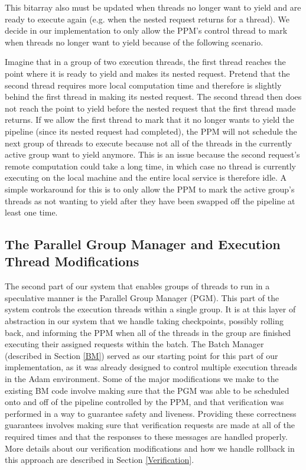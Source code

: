 \documentclass[11pt, oneside]{report}
\begin{document}
This bitarray also must be updated when threads no longer want to yield and are ready to execute again (e.g. when the nested request returns for a thread). 
We decide in our implementation to only allow the PPM's control thread to mark when threads no longer want to yield because of the following scenario. 

Imagine that in a group of two execution threads, the first thread reaches the point where it is ready to yield and makes its nested request.
Pretend that the second thread requires more local computation time and therefore is slightly behind the first thread in making its nested request.
The second thread then does not reach the point to yield before the nested request that the first thread made returns.
If we allow the first thread to mark that it no longer wants to yield the pipeline (since its nested request had completed), the PPM will not schedule the next group of threads to execute because not all of the threads in the currently active group want to yield anymore.
This is an issue because the second request's remote computation could take a long time, in which case no thread is currently executing on the local machine and the entire local service is therefore idle.
A simple workaround for this is to only allow the PPM to mark the active group's threads as not wanting to yield after they have been swapped off the pipeline at least one time.

\subsection{The Parallel Group Manager and Execution Thread Modifications}

The second part of our system that enables groups of threads to run in a speculative manner is the Parallel Group Manager (PGM). This part of the system controls the execution threads within a single group.
It is at this layer of abstraction in our system that we handle taking checkpoints, possibly rolling back, and informing the PPM when all of the threads in the group are finished executing their assigned requests within the batch.
The Batch Manager (described in Section \ref{BM}) served as our starting point for this part of our implementation, as it was already designed to control multiple execution threads in the Adam environment.
Some of the major modifications we make to the existing BM code involve making sure that the PGM was able to be scheduled onto and off of the pipeline controlled by the PPM, and that verification was performed in a way to guarantee safety and liveness. 
Providing these correctness guarantees involves making sure that verification requests are made at all of the required times and that the responses to these messages are handled properly. 
More details about our verification modifications and how we handle rollback in this approach are described in Section \ref{Verification}. 
\end{document}
